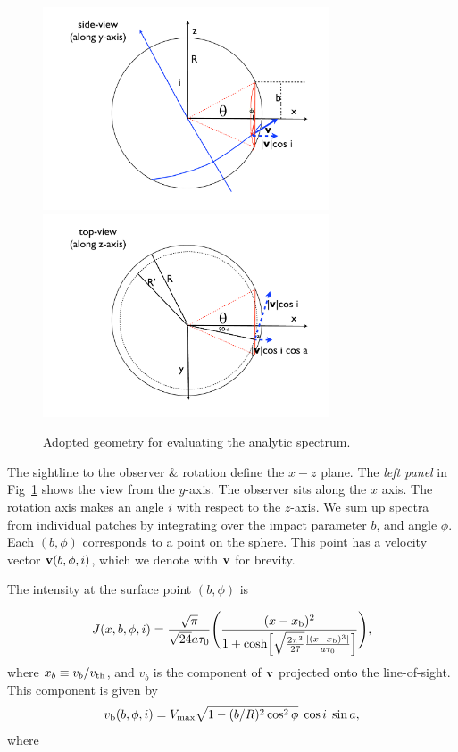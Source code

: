 \documentclass{emulateapj}
\newcommand{\hs}{{\hspace{1mm}}}
\begin{document}
\begin{figure}[h]
\centerline{\includegraphics[width=85mm]{fig11a.pdf}
\includegraphics[width=85mm]{fig11b.pdf}}
\caption[]{Adopted geometry for evaluating the analytic spectrum.}
\label{fig:scheme}
\end{figure} 

The sightline to the observer \& rotation define the $x-z$ plane. 
The {\it left panel} in Fig~\ref{fig:scheme} shows the view from the $y$-axis. 
The observer sits along the $x$ axis. 
The rotation axis makes an angle $i$ with respect to the $z$-axis. 
We sum up spectra from individual patches by integrating over the
impact parameter $b$, and angle $\phi$. 
Each $(b,\phi)$ corresponds to a point on the sphere. 
This point has a velocity vector ${\bf v}(b,\phi,i)$, which we denote
with ${\bf v}$ for brevity. 


The intensity at the surface point $(b,\phi)$ is 

\begin{displaymath}
J(x,b,\phi,i)=\frac{\sqrt{\pi}}{\sqrt{24}a\tau_0}\Bigg{(}\frac{(x-x_{\rm
    b})^2}{1+{\rm cosh}\Big{[}\sqrt{\frac{2\pi^3}{27}}\frac{|(x
      -x_{\rm b})^3|}{a\tau_0}\Big{]}}\Bigg{)},
\end{displaymath} 
%
where $x_b\equiv v_{b}/v_{\rm th}$, and $v_b$ is the component of ${\bf v}$ projected onto the line-of-sight. This component is given by
\begin{equation}
v_{\rm b}(b,\phi,i)=V_{\rm max}\sqrt{1-(b/R)^2\cos^2 \phi}\hs \cos i
\hs \sin a,
\end{equation}
%
where
\end{document}
